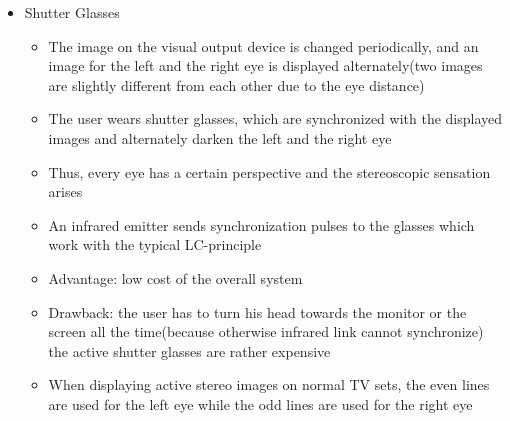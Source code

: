\documentclass{standalone}
\begin{document}
\begin{itemize}
	\item Shutter Glasses
	\begin{itemize}
		\item The image on the visual output device is changed periodically, and an image for the left and the right eye is displayed alternately(two images are slightly different from each other due to the eye distance)
		\item The user wears shutter glasses, which are synchronized with the displayed images and alternately darken the left and the right eye
		\item Thus, every eye has a certain perspective and the stereoscopic sensation arises
		\item An infrared emitter sends synchronization pulses to the glasses which work with the typical LC-principle
		\item Advantage: low cost of the overall system
		\item Drawback: the user has to turn his head towards the monitor or the screen all the time(because otherwise infrared link cannot synchronize) \\
		the active shutter glasses are rather expensive
		\item When displaying active stereo images on normal TV sets, the even lines are used for the left eye while the odd lines are used for the right eye
	\end{itemize}
	

\end{itemize}
\end{document}
